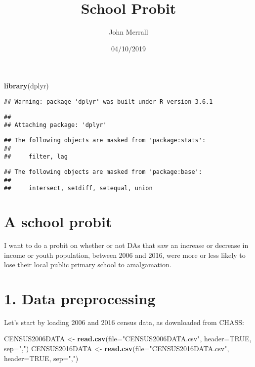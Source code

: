 \documentclass[]{article}
\title{School Probit}
\author{John Merrall}
\date{04/10/2019}
\newenvironment{Shaded}{\begin{snugshade}}{\end{snugshade}}
\newcommand{\DataTypeTok}[1]{\textcolor[rgb]{0.13,0.29,0.53}{#1}}
\newcommand{\KeywordTok}[1]{\textcolor[rgb]{0.13,0.29,0.53}{\textbf{#1}}}
\newcommand{\NormalTok}[1]{#1}
\newcommand{\OtherTok}[1]{\textcolor[rgb]{0.56,0.35,0.01}{#1}}
\newcommand{\StringTok}[1]{\textcolor[rgb]{0.31,0.60,0.02}{#1}}
\begin{document}
\maketitle

\begin{Shaded}
\begin{Highlighting}[]
\KeywordTok{library}\NormalTok{(dplyr)}
\end{Highlighting}
\end{Shaded}

\begin{verbatim}
## Warning: package 'dplyr' was built under R version 3.6.1
\end{verbatim}

\begin{verbatim}
## 
## Attaching package: 'dplyr'
\end{verbatim}

\begin{verbatim}
## The following objects are masked from 'package:stats':
## 
##     filter, lag
\end{verbatim}

\begin{verbatim}
## The following objects are masked from 'package:base':
## 
##     intersect, setdiff, setequal, union
\end{verbatim}

\hypertarget{a-school-probit}{%
\section{A school probit}\label{a-school-probit}}

I want to do a probit on whether or not DAs that saw an increase or
decrease in income or youth population, between 2006 and 2016, were more
or less likely to lose their local public primary school to
amalgamation.

\hypertarget{data-preprocessing}{%
\section{1. Data preprocessing}\label{data-preprocessing}}

Let's start by loading 2006 and 2016 census data, as downloaded from
CHASS:

\begin{Shaded}
\begin{Highlighting}[]
\NormalTok{CENSUS2006DATA <-}\StringTok{ }\KeywordTok{read.csv}\NormalTok{(}\DataTypeTok{file=}\StringTok{"CENSUS2006DATA.csv"}\NormalTok{, }\DataTypeTok{header=}\OtherTok{TRUE}\NormalTok{, }\DataTypeTok{sep=}\StringTok{","}\NormalTok{)}
\NormalTok{CENSUS2016DATA <-}\StringTok{ }\KeywordTok{read.csv}\NormalTok{(}\DataTypeTok{file=}\StringTok{"CENSUS2016DATA.csv"}\NormalTok{, }\DataTypeTok{header=}\OtherTok{TRUE}\NormalTok{, }\DataTypeTok{sep=}\StringTok{","}\NormalTok{)}
\end{Highlighting}
\end{Shaded}
\end{document}
